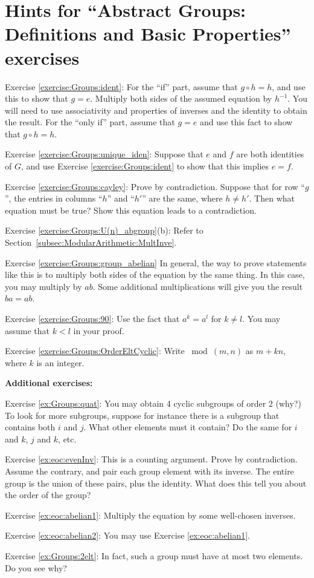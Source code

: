 \section{Hints for ``Abstract Groups: Definitions and Basic Properties'' exercises}
\label{sec:Groups:Hints}

\noindent Exercise \ref{exercise:Groups:ident}: For the ``if'' part, assume that $g \circ h = h$, and use this to show that $g = e$. Multiply both sides of the assumed equation by $h^{-1}$. You will need to use associativity and properties of inverses and the identity to obtain the result.  For the ``only if'' part, assume that $g=e$ and use this fact to show that $g \circ h = h$.

\noindent Exercise \ref{exercise:Groups:unique_iden}: Suppose that $e$ and $f$ are both identities of $G$, and use Exercise \ref{exercise:Groups:ident} to show that this implies $e=f$. 


\noindent Exercise \ref{exercise:Groups:cayley}: Prove by contradiction. Suppose that for row ``$g$'', the entries in columns ``$h$'' and ``$h'$'' are the same, where $h \neq h'$.  Then what equation must be true? Show this equation leads to a contradiction.

\noindent Exercise \ref{exercise:Groups:U(n)_abgroup}(b): Refer to Section~\ref{subsec:ModularArithmetic:MultInve}.

\noindent Exercise \ref{exercise:Groups:group_abelian} In general, the way to prove statements like this is to multiply both sides of the equation by the same thing.  In this case, you may multiply by $ab$.  Some additional multiplications will give you the result $ba=ab$.

\noindent Exercise \ref{exercise:Groups:90}: Use the fact that $a^k = a^l$ for $k \neq l$.  You may assume that $k < l$ in your proof.

\noindent Exercise \ref{exercise:Groups:OrderEltCyclic}: Write $\bmod(m,n)$ as $m + kn$, where $k$ is an integer.

\bigskip

\textbf{Additional exercises:}

\noindent Exercise \ref{ex:Groups:quat}: You may obtain 4 cyclic subgroups of order 2 (why?)  To look for more subgroups, suppose for instance there is a subgroup that contains both $i$ and $j$.  What other elements must it contain?  Do the same for $i$ and $k$, $j$ and $k$, etc.

\noindent Exercise \ref{ex:eoc:evenInv}: This is a counting argument. Prove by contradiction. Assume the contrary, and pair each group element with its inverse. The entire group is the union of these pairs, plus the identity. What does this tell you about the order of the group?

\noindent Exercise \ref{ex:eoc:abelian1}: Multiply the equation by some well-chosen inverses.

\noindent Exercise \ref{ex:eoc:abelian2}: You may use Exercise \ref{ex:eoc:abelian1}.

\noindent Exercise \ref{ex:Groups:2elt}: In fact, such a group must have at most two elements. Do you see why?

